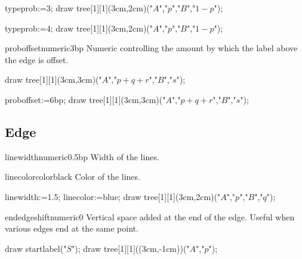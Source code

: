 \documentclass[11pt,a4paper,english]{article}
\begin{document}
\begin{exemple}[lefthand ratio=0.7]
 typeprob:=3;
 draw tree[1][1](3cm,2cm)("$A$","$p$","$B$","$1-p$");
\end{exemple}

\begin{exemple}[lefthand ratio=0.7]
 typeprob:=4;
 draw tree[1][1](3cm,2cm)("$A$","$p$","$B$","$1-p$");
\end{exemple}



\begin{mptparam}{proboffset}{numeric}{3bp}
Numeric controlling the amount by which the label above the edge is offset.
\end{mptparam}

\begin{exemple}[lefthand ratio=0.75]
 draw tree[1][1](3cm,3cm)("$A$","$p+q+r$","$B$","$s$");
\end{exemple}



\begin{exemple}[lefthand ratio=0.75]
 proboffset:=6bp;
 draw tree[1][1](3cm,3cm)("$A$","$p+q+r$","$B$","$s$");
\end{exemple}


\subsection{Edge}
\begin{mptparam}{linewidth}{numeric}{0.5bp}
Width of the lines.
\end{mptparam}

\begin{mptparam}{linecolor}{color}{black}
Color of the lines.
\end{mptparam}

\begin{exemple}[lefthand ratio=0.65]
 linewidth:=1.5;
 linecolor:=blue;
 draw tree[1][1](3cm,2cm)("$A$","$p$","$B$","$q$");
\end{exemple}

\begin{mptparam}{endedgeshift}{numeric}{0}
Vertical space added at the end of the edge. Useful when various edges end at the same point.
\end{mptparam}

\begin{exemple}[lefthand ratio=0.65]
 draw startlabel("$S$");
 draw tree[1][1]((3cm,-1cm))("$A$","$p$");
\end{exemple}
\end{document}
